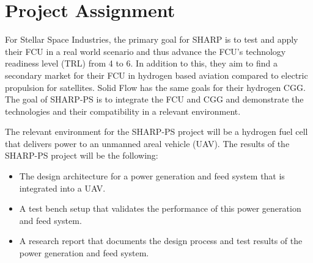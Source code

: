 \section{Project Assignment}
For Stellar Space Industries, the primary goal for SHARP is to test and apply their FCU in a real world scenario and thus advance the FCU's technology readiness level (TRL) from 4 to 6. In addition to this, they aim to find a secondary market for their FCU in hydrogen based aviation compared to electric propulsion for satellites. Solid Flow has the same goals for their hydrogen CGG.
The goal of SHARP-PS is to integrate the FCU and CGG and demonstrate the technologies and their compatibility in a relevant environment.

The relevant environment for the SHARP-PS project will be a hydrogen fuel cell that delivers power to an unmanned areal vehicle (UAV). The results of the SHARP-PS project will be the following:

\begin{itemize}
    \item The design architecture for a power generation and feed system that is integrated into a UAV.
    \item A test bench setup that validates the performance of this power generation and feed system.
    \item A research report that documents the design process and test results of the power generation and feed system.
\end{itemize}




